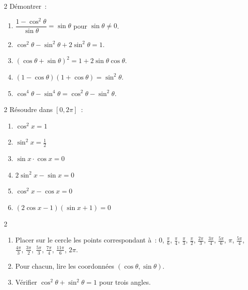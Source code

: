 \begin{exo}{2}
D\'emontrer~:
\begin{enumerate}
  \item $\dfrac{1-\cos^2\theta}{\sin\theta} = \sin\theta$
        pour $\sin\theta\ne0$.
  \item $\cos^2\theta - \sin^2\theta + 2\sin^2\theta = 1$.
  \item $(\cos\theta+\sin\theta)^2 = 1 + 2\sin\theta\cos\theta$.
  \item $(1-\cos\theta)(1+\cos\theta) = \sin^2\theta$.
  \item $\cos^4\theta - \sin^4\theta = \cos^2\theta - \sin^2\theta$.
\end{enumerate}
\end{exo}

\begin{exo}{2}
R\'esoudre dans $[0,2\pi]$~:
\begin{enumerate}
  \item $\cos^2 x = 1$
  \item $\sin^2 x = \frac{1}{2}$
  \item $\sin x \cdot \cos x = 0$
  \item $2\sin^2 x - \sin x = 0$
  \item $\cos^2 x - \cos x = 0$
  \item $(2\cos x - 1)(\sin x + 1) = 0$
\end{enumerate}
\end{exo}

\begin{exo}{2}
\begin{enumerate}
  \item Placer sur le cercle les points correspondant \`a~:
        $0$, $\frac{\pi}{6}$, $\frac{\pi}{4}$, $\frac{\pi}{3}$, $\frac{\pi}{2}$, $\frac{2\pi}{3}$, $\frac{3\pi}{4}$,
        $\frac{5\pi}{6}$, $\pi$, $\frac{5\pi}{4}$, $\frac{4\pi}{3}$, $\frac{3\pi}{2}$, $\frac{5\pi}{3}$, $\frac{7\pi}{4}$,
        $\frac{11\pi}{6}$, $2\pi$.
  \item Pour chacun, lire les coordonn\'ees $(\cos\theta,\sin\theta)$.
  \item V\'erifier $\cos^2\theta+\sin^2\theta=1$ pour trois angles.
\end{enumerate}
\end{exo}

